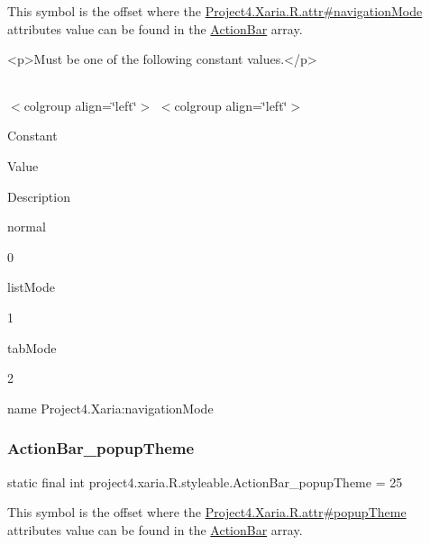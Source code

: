 This symbol is the offset where the \hyperlink{}{Project4.\+Xaria.\+R.\+attr\#navigation\+Mode} attribute\textquotesingle{}s value can be found in the \hyperlink{classproject4_1_1xaria_1_1R_1_1styleable_accb530194c58ee3abb15587da8869e99}{Action\+Bar} array.

\begin{DoxyVerb}      <p>Must be one of the following constant values.</p>
\end{DoxyVerb}
 \tabulinesep=1mm
\begin{longtabu} spread 0pt [c]{*{0}{|X[-1]}|}
\hline
\end{longtabu}
$<$colgroup align=\char`\"{}left\char`\"{}$>$ $<$colgroup align=\char`\"{}left\char`\"{}$>$ 

Constant

Value

Description 

{\ttfamily normal}

0

{\ttfamily list\+Mode}

1

{\ttfamily tab\+Mode}

2

name Project4.\+Xaria\+:navigation\+Mode \mbox{\label{classproject4_1_1xaria_1_1R_1_1styleable_af32e42a2ea26936b7608c41f68c9ae51}} 
\subsubsection{\texorpdfstring{Action\+Bar\+\_\+popup\+Theme}{ActionBar\_popupTheme}}
{\footnotesize\ttfamily static final int project4.\+xaria.\+R.\+styleable.\+Action\+Bar\+\_\+popup\+Theme = 25\hspace{0.3cm}{\ttfamily [static]}}

This symbol is the offset where the \hyperlink{}{Project4.\+Xaria.\+R.\+attr\#popup\+Theme} attribute\textquotesingle{}s value can be found in the \hyperlink{classproject4_1_1xaria_1_1R_1_1styleable_accb530194c58ee3abb15587da8869e99}{Action\+Bar} array.

